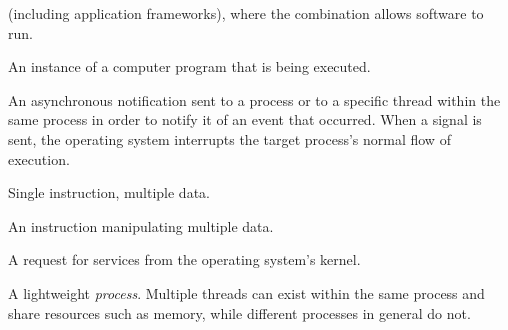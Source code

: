 \begin {description}
		(including application frameworks), where the combination allows
		software to run.
	\item [Process] An instance of a computer program that is being executed.
	\item [Signal] An asynchronous notification sent to a process or to a
		specific thread within the same process in order to notify it of an
		event that occurred. When a signal is sent, the operating system
		interrupts the target process's normal flow of execution.
	\item [SIMD] Single instruction, multiple data.
	\item [SIMD instruction] An instruction manipulating multiple data.
	\item [System call] A request for services from the operating system's
		kernel.
	\item [Thread] A lightweight \emph{process}. Multiple threads can exist
		within the same process and share resources such as memory, while
		different processes in general do not.
\end {description}

